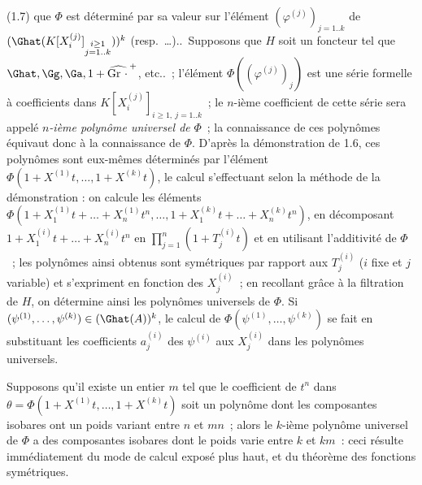 (1.7) que \(\Phi\) est
déterminé par sa valeur sur l'élément \((\varphi^{(j)})_{j=1..k}\) de \((\Ghat(K[X_i^{(j)}]_{\substack{i\geq1\\ j=1..k}}))^k\) (resp.\ \ldots)..\ Supposons que \(H\) soit un foncteur tel que \(\Ghat,\Gg,\Ga,1+\widehat{\operatorname{Gr}\,\cdot\,}^{+}\), etc..~; l'élément \(\Phi((\varphi^{(j)})_{j})\) est une série formelle à coefficients dans \(K[X_i^{(j)}]_{i\geq1,\ j=1..k}\)~; le \(n\)-ième coefficient de cette série sera appelé \emph{\(n\)-ième polynôme universel de} \(\Phi\)~; la connaissance de ces polynômes équivaut donc à la connaissance de \(\Phi\). D'après la démonstration de 1.6, ces polynômes sont eux-mêmes déterminés par l'élément \(\Phi(1+X^{(1)}t,\ldots,1+X^{(k)}t)\), le calcul s'effectuant selon la méthode de la démonstration : on calcule les éléments \(\Phi(1+X_1^{(1)}t+\ldots+X_n^{(1)}t^n,\ldots,1+X_1^{(k)}t+\ldots+X_n^{(k)}t^n)\), en décomposant \(1+X_1^{(i)}t+\ldots+X_n^{(i)}t^n\) en \(\prod_{j=1}^{n}(1+T_j^{(i)}t)\) et en utilisant l'additivité de \(\Phi\)~; les polynômes ainsi obtenus sont symétriques par rapport aux \(T_j^{(i)}\) (\(i\) fixe et \(j\) variable) et s'expriment en fonction des \(X_j^{(i)}\)~; en recollant grâce à la filtration de \(H\), on détermine ainsi les polynômes universels de \(\Phi\). Si \((\psi^{(1)},\ldots,\psi^{(k)})\in(\Ghat(A))^k\), le calcul de \(\Phi(\psi^{(1)},\ldots,\psi^{(k)})\) se fait en substituant les coefficients \(a_j^{(i)}\) des \(\psi^{(i)}\) aux \(X_j^{(i)}\) dans les polynômes universels.

Supposons qu'il existe un entier \(m\) tel que le coefficient de \(t^n\) dans \(\theta=\Phi(1+X^{(1)}t,\ldots,1+X^{(k)}t)\) soit un polynôme dont les composantes isobares ont un poids variant entre \(n\) et \(mn\)~; alors le \(k\)-ième polynôme universel de \(\Phi\) a des composantes isobares dont le poids varie entre \(k\) et \(km\)~: ceci résulte immédiatement du mode de calcul exposé plus haut, et du théorème des fonctions symétriques.

